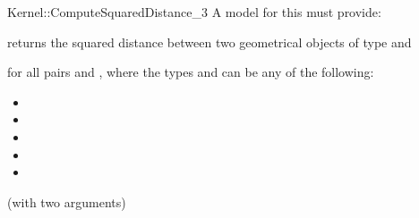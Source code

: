 \begin{ccRefFunctionObjectConcept}{Kernel::ComputeSquaredDistance_3}
A model for this must provide:


{returns the squared distance between two geometrical objects of type
 and  }

for all pairs  and , where
the types  and  can be any of the
following:
\begin{itemize}
\item {}
\item {}
\item {}
\item {}
\item {}
\end{itemize}

\ccRefines
{} (with two arguments)

\ccSeeAlso
{}  \\

\end{ccRefFunctionObjectConcept}
